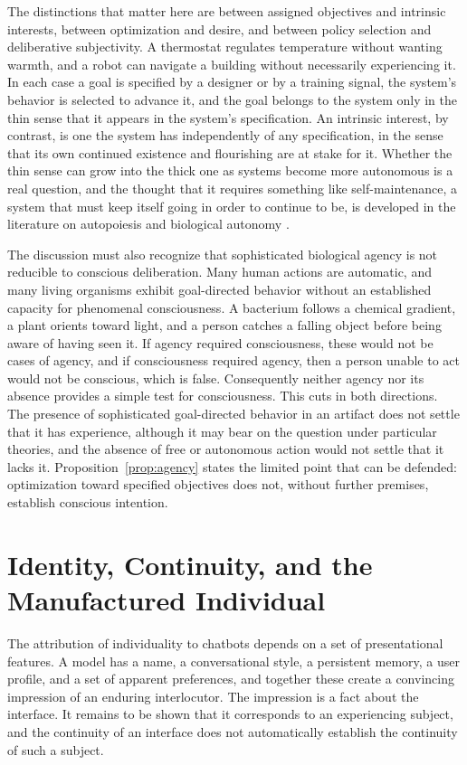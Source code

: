 \documentclass[12pt]{article}
\theoremstyle{definition}
\begin{document}
The distinctions that matter here are between assigned objectives and intrinsic interests, between optimization and desire, and between policy selection and deliberative subjectivity. A thermostat regulates temperature without wanting warmth, and a robot can navigate a building without necessarily experiencing it. In each case a goal is specified by a designer or by a training signal, the system's behavior is selected to advance it, and the goal belongs to the system only in the thin sense that it appears in the system's specification. An intrinsic interest, by contrast, is one the system has independently of any specification, in the sense that its own continued existence and flourishing are at stake for it. Whether the thin sense can grow into the thick one as systems become more autonomous is a real question, and the thought that it requires something like self-maintenance, a system that must keep itself going in order to continue to be, is developed in the literature on autopoiesis and biological autonomy \cite{maturana1980,thompson2007}.

The discussion must also recognize that sophisticated biological agency is not reducible to conscious deliberation. Many human actions are automatic, and many living organisms exhibit goal-directed behavior without an established capacity for phenomenal consciousness. A bacterium follows a chemical gradient, a plant orients toward light, and a person catches a falling object before being aware of having seen it. If agency required consciousness, these would not be cases of agency, and if consciousness required agency, then a person unable to act would not be conscious, which is false. Consequently neither agency nor its absence provides a simple test for consciousness. This cuts in both directions. The presence of sophisticated goal-directed behavior in an artifact does not settle that it has experience, although it may bear on the question under particular theories, and the absence of free or autonomous action would not settle that it lacks it. Proposition~\ref{prop:agency} states the limited point that can be defended: optimization toward specified objectives does not, without further premises, establish conscious intention.

\section{Identity, Continuity, and the Manufactured Individual}
\label{sec:identity}

The attribution of individuality to chatbots depends on a set of presentational features. A model has a name, a conversational style, a persistent memory, a user profile, and a set of apparent preferences, and together these create a convincing impression of an enduring interlocutor. The impression is a fact about the interface. It remains to be shown that it corresponds to an experiencing subject, and the continuity of an interface does not automatically establish the continuity of such a subject.
\end{document}
